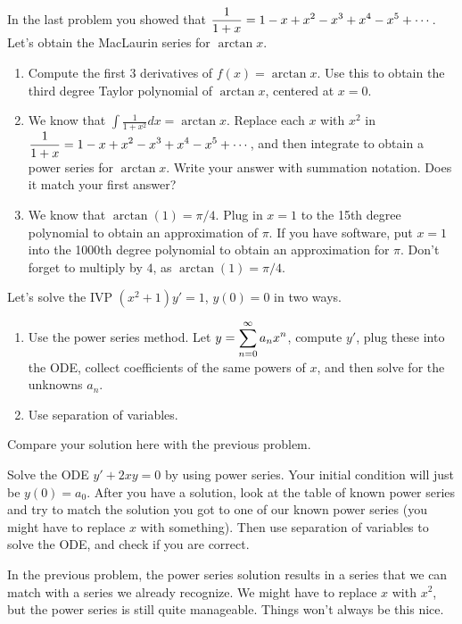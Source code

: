 \begin{problem}
In the last problem you showed that $\displaystyle\frac{1}{1+x}=1-x+x^2-x^3+x^4-x^5+\cdots$.  Let's obtain the MacLaurin series for $\arctan x$. 
\begin{enumerate}
 \item Compute the first 3 derivatives of $f(x) = \arctan x$. Use this to obtain the third degree Taylor polynomial of $\arctan x$, centered at $x=0$.
 \item We know that $\int \frac{1}{1+x^2}dx = \arctan x$.  Replace each $x$ with $x^2$ in  $\displaystyle\frac{1}{1+x}=1-x+x^2-x^3+x^4-x^5+\cdots$, and then integrate to obtain a power series for $\arctan x$. Write your answer with summation notation. Does it match your first answer?
 \item We know that $\arctan(1) = \pi/4$. Plug in $x=1$ to the 15th degree polynomial to obtain an approximation of $\pi$. If you have software, put $x=1$ into the 1000th degree polynomial to obtain an approximation for $\pi$.  Don't forget to multiply by $4$, as $\arctan(1)=\pi/4$.  
\end{enumerate}
\end{problem}


\begin{problem}
 Let's solve the IVP $(x^2+1)y'=1$, $y(0)=0$ in two ways. 
\begin{enumerate}
 \item Use the power series method. Let $\displaystyle y = \sum_{n=0}^\infty a_nx^n$, compute $y'$, plug these into the ODE, collect coefficients of the same powers of $x$, and then solve for the unknowns $a_n$.
 \item Use separation of variables. 
\end{enumerate}
Compare your solution here with the previous problem.
\end{problem}


\begin{problem}
 Solve the ODE $y'+2xy=0$ by using power series.  Your initial condition will just be $y(0)=a_0$. After you have a solution, look at the table of known power series and try to match the solution you got to one of our known power series (you might have to replace $x$ with something). Then use separation of variables to solve the ODE, and check if you are correct.  
\end{problem}

In the previous problem, the power series solution results in a series that we can match with a series we already recognize.  We might have to replace $x$ with $x^2$, but the power series is still quite manageable.  Things won't always be this nice. 

